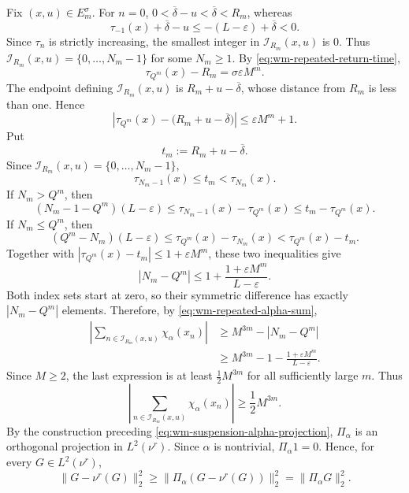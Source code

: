 \documentclass[11pt,reqno,a4paper]{amsart}
\numberwithin{equation}{section}
\theoremstyle{compact}
\theoremstyle{definition}
\theoremstyle{definition}
\begin{document}
Fix $(x,u)\in E_m^\sigma$.  For $n=0$,
$0<\overline\delta-u<\overline\delta<R_m$, whereas
\[
  \tau_{-1}(x)+\overline\delta-u
  \leq -(L-\varepsilon)+\overline\delta<0.
\]
Since $\tau_n$ is strictly increasing, the smallest integer in
$\mathcal I_{R_m}(x,u)$ is $0$.  Thus
$\mathcal I_{R_m}(x,u)=\{0,\ldots,N_m-1\}$ for some $N_m\geq1$.
By \eqref{eq:wm-repeated-return-time},
\[
  \tau_{Q^m}(x)-R_m=\sigma\varepsilon M^m.
\]
The endpoint defining $\mathcal I_{R_m}(x,u)$ is
$R_m+u-\overline\delta$, whose distance from $R_m$ is less than one.  Hence
\[
  \left|\tau_{Q^m}(x)-\bigl(R_m+u-\overline\delta\bigr)\right|
  \leq \varepsilon M^m+1.
\]
Put
\[
  t_m:=R_m+u-\overline\delta.
\]
Since $\mathcal I_{R_m}(x,u)=\{0,\ldots,N_m-1\}$,
\begin{equation}\label{eq:wm-special-crossing-index}
  \tau_{N_m-1}(x)\leq t_m<\tau_{N_m}(x).
\end{equation}
If $N_m>Q^m$, then
\[
  (N_m-1-Q^m)(L-\varepsilon)
  \leq \tau_{N_m-1}(x)-\tau_{Q^m}(x)
  \leq t_m-\tau_{Q^m}(x).
\]
If $N_m\leq Q^m$, then
\[
  (Q^m-N_m)(L-\varepsilon)
  \leq \tau_{Q^m}(x)-\tau_{N_m}(x)
  <\tau_{Q^m}(x)-t_m.
\]
Together with
$|\tau_{Q^m}(x)-t_m|\leq1+\varepsilon M^m$, these two inequalities give
\begin{equation}\label{eq:wm-index-count-error-at-special-scale}
  |N_m-Q^m|
  \leq 1+\frac{1+\varepsilon M^m}{L-\varepsilon}.
\end{equation}
Both index sets start at zero, so their symmetric difference has exactly
$|N_m-Q^m|$ elements.  Therefore, by
\eqref{eq:wm-repeated-alpha-sum},
\[
\begin{aligned}
  \left|
    \sum_{n\in\mathcal I_{R_m}(x,u)}\chi_\alpha(x_n)
  \right|
  &\geq M^{3m}-|N_m-Q^m| \\
  &\geq M^{3m}-1-\frac{1+\varepsilon M^m}{L-\varepsilon}.
\end{aligned}
\]
Since $M\geq2$, the last expression is at least
$\frac12M^{3m}$ for all sufficiently large $m$.  Thus
\begin{equation}\label{eq:wm-alpha-lower-bound}
  \left|
    \sum_{n\in\mathcal I_{R_m}(x,u)}\chi_\alpha(x_n)
  \right|
  \geq\frac12M^{3m}.
\end{equation}
By the construction preceding
\eqref{eq:wm-suspension-alpha-projection}, $\Pi_\alpha$ is an
orthogonal projection in $L^2(\nu^r)$.  Since $\alpha$ is nontrivial,
$\Pi_\alpha 1=0$.  Hence, for every $G\in L^2(\nu^r)$,
\begin{equation}\label{eq:wm-projection-variance-inequality}
  \|G-\nu^r(G)\|_2^2
  \geq\|\Pi_\alpha(G-\nu^r(G))\|_2^2
  =\|\Pi_\alpha G\|_2^2.
\end{equation}
\end{document}

